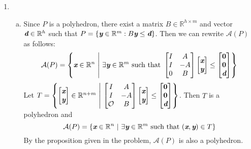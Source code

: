 \begin{enumerate}
	\newpage 
	\item {}
	\begin{enumerate}[(a)]
		\item Since $P$ is a polyhedron, there exist a matrix $B\in \mathbb{R}^{h\times m}$ and vector $\textit{\textbf{d}}\in \mathbb{R}^h$ such that $P =\{\textit{\textbf{y}} \in \mathbb{R}^m: B\textit{\textbf{y}} \le \textit{\textbf{d}} \}$. Then we can rewrite $\mathcal{A}(P)$ as follows:
		\[
		\mathcal{A}(P) = \left\{ 
		\textit{\textbf{x}} \in \mathbb{R}^{n} ~\middle |~ \exists \textit{\textbf{y}}\in \mathbb{R}^m \text{ such that } \begin{bmatrix}
		I & A\\
		I & -A\\
		0 & B
		\end{bmatrix} \begin{bmatrix}
		\textit{\textbf{x}} \\ \textit{\textbf{y}}
		\end{bmatrix} \le \begin{bmatrix}
		\textbf{0}\\\textbf{0}\\\textit{\textbf{d}}
		\end{bmatrix}  \right\}
		\]
		Let $T = \left\{ \begin{bmatrix}
		\textit{\textbf{x}} \\ \textit{\textbf{y}}
		\end{bmatrix} \in \mathbb{R}^{n+m} ~\middle |~ \begin{bmatrix}
		I & A\\
		I & -A\\
		\mathcal{O} & B
		\end{bmatrix} \begin{bmatrix}
		\textit{\textbf{x}} \\ \textit{\textbf{y}}
		\end{bmatrix} \le \begin{bmatrix}
		\textbf{0}\\\textbf{0}\\\textit{\textbf{d}}
		\end{bmatrix}  \right\}$. Then $T$ is a polyhedron and  
		\[
		\mathcal{A}(P) = \left\{ 
		\textit{\textbf{x}} \in \mathbb{R}^{n} ~\middle |~ \exists \textit{\textbf{y}}\in \mathbb{R}^m \text{ such that } (\textit{\textbf{x}},\textit{\textbf{y}})\in T\right\}
		\]
		By the proposition given in the problem, $\mathcal{A}(P)$ is also a polyhedron.
		

\end{enumerate}
\end{enumerate}

